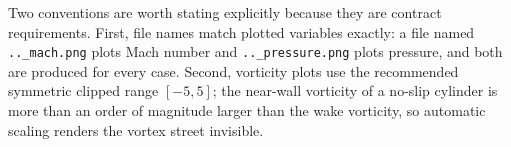 Two conventions are worth stating explicitly because they are contract
requirements. First, file names match plotted variables exactly: a file named
\texttt{..\_mach.png} plots Mach number and \texttt{..\_pressure.png} plots
pressure, and both are produced for every case. Second, vorticity plots use the
recommended symmetric clipped range $[-5,5]$; the near-wall vorticity of a no-slip
cylinder is more than an order of magnitude larger than the wake vorticity, so
automatic scaling renders the vortex street invisible.
